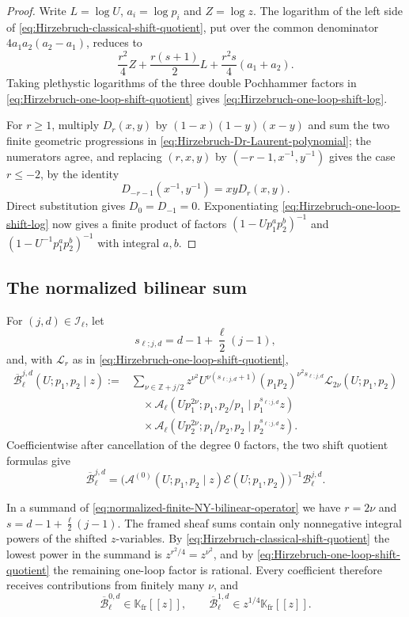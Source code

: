 \documentclass{amsart}
\theoremstyle{definition}
\numberwithin{equation}{section}
\newcommand{\Z}{\mathbb Z}
\newcommand{\K}{\mathbb K}
\begin{document}
\begin{proof}
Write \(L=\log U\), \(a_i=\log p_i\) and \(Z=\log z\).  The logarithm of the left side of \eqref{eq:Hirzebruch-classical-shift-quotient}, put over the common denominator \(4a_1a_2(a_2-a_1)\), reduces to
\[
 \frac{r^2}{4}Z+\frac{r(s+1)}2L+\frac{r^2s}{4}(a_1+a_2).
\]
Taking plethystic logarithms of the three double Pochhammer factors in \eqref{eq:Hirzebruch-one-loop-shift-quotient} gives \eqref{eq:Hirzebruch-one-loop-shift-log}.

For \(r\geq1\), multiply \(D_r(x,y)\) by \((1-x)(1-y)(x-y)\) and sum the two finite geometric progressions in \eqref{eq:Hirzebruch-Dr-Laurent-polynomial}; the numerators agree, and replacing \((r,x,y)\) by \((-r-1,x^{-1},y^{-1})\) gives the case \(r\leq-2\), by the identity
\[
 D_{-r-1}(x^{-1},y^{-1})=xyD_r(x,y).
\]
Direct substitution gives \(D_0=D_{-1}=0\).  Exponentiating \eqref{eq:Hirzebruch-one-loop-shift-log} now gives a finite product of factors \((1-Up_1^ap_2^b)^{-1}\) and \((1-U^{-1}p_1^ap_2^b)^{-1}\) with integral \(a,b\).
\end{proof}

\subsection{The normalized bilinear sum}
For \((j,d)\in\mathcal I_\ell\), let
\[
 s_{\ell;j,d}=d-1+\frac\ell2(j-1),
\]
and, with \(\mathcal L_r\) as in \eqref{eq:Hirzebruch-one-loop-shift-quotient},
\begin{equation}
\begin{aligned}
 \overline{\mathscr B}_{\ell}^{j,d}(U;p_1,p_2\mid z)
 :={}&\sum_{\nu\in\Z+j/2}
 z^{\nu^2}U^{\nu(s_{\ell;j,d}+1)}
 (p_1p_2)^{\nu^2s_{\ell;j,d}}
 \mathcal L_{2\nu}(U;p_1,p_2)\\
 &\quad\times
 \mathcal A_\ell\left(
 Up_1^{2\nu};p_1,p_2/p_1
 \mid p_1^{s_{\ell;j,d}}z\right)\\
 &\quad\times
 \mathcal A_\ell\left(
 Up_2^{2\nu};p_1/p_2,p_2
 \mid p_2^{s_{\ell;j,d}}z\right).
\end{aligned}
\label{eq:normalized-finite-NY-bilinear-operator}
\end{equation}
Coefficientwise after cancellation of the degree \(0\) factors, the two shift quotient formulas give
\[
 \overline{\mathscr B}_{\ell}^{j,d}
 =\bigl(\mathcal A^{(0)}(U;p_1,p_2\mid z)
          \mathcal E(U;p_1,p_2)\bigr)^{-1}
   \mathscr B_{\ell}^{j,d}.
\]

In a summand of \eqref{eq:normalized-finite-NY-bilinear-operator} we have \(r=2\nu\) and \(s=d-1+\frac\ell2(j-1)\).  The framed sheaf sums contain only nonnegative integral powers of the shifted \(z\)-variables.  By \eqref{eq:Hirzebruch-classical-shift-quotient} the lowest power in the summand is \(z^{r^2/4}=z^{\nu^2}\), and by \eqref{eq:Hirzebruch-one-loop-shift-quotient} the remaining one-loop factor is rational.  Every coefficient therefore receives contributions from finitely many \(\nu\), and
\[
 \overline{\mathscr B}_{\ell}^{0,d}
 \in\K_{\mathrm{fr}}[[z]],
 \qquad
 \overline{\mathscr B}_{\ell}^{1,d}
 \in z^{1/4}\K_{\mathrm{fr}}[[z]].
\]
\end{document}

